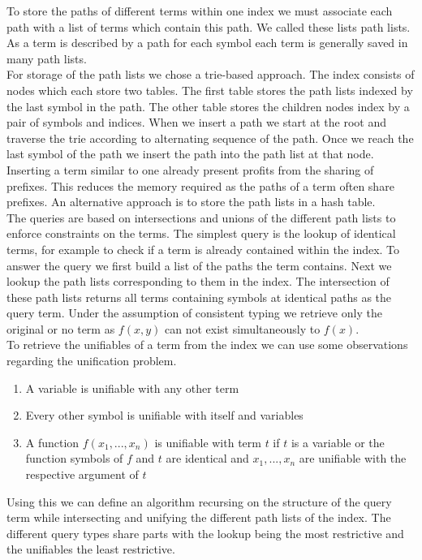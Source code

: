 To store the paths of different terms within one index we must associate each path with a list of terms which contain this path. We called these lists path lists. As a term is described by a path for each symbol each term is generally saved in many path lists.\\
For storage of the path lists we chose a trie-based approach. The index consists of nodes which each store two tables. The first table stores the path lists indexed by the last symbol in the path. The other table stores the children nodes index by a pair of symbols and indices. When we insert a path we start at the root and traverse the trie according to alternating sequence of the path. Once we reach the last symbol of the path we insert the path into the path list at that node. Inserting a term similar to one already present profits from the sharing of prefixes. This reduces the memory required as the paths of a term often share prefixes. An alternative approach is to store the path lists in a hash table.\\
The queries are based on intersections and unions of the different path lists to enforce constraints on the terms. The simplest query is the lookup of identical terms, for example to check if a term is already contained within the index. To answer the query we first build a list of the paths the term contains. Next we lookup the path lists corresponding to them in the index. The intersection of these path lists returns all terms containing symbols at identical paths as the query term. Under the assumption of consistent typing we retrieve only the original or no term as $f(x,y)$ can not exist simultaneously to $f(x)$.\\
To retrieve the unifiables of a term from the index we can use some observations regarding the unification problem.
\begin{enumerate}
  \item A variable is unifiable with any other term
  \item Every other symbol is unifiable with itself and variables
  \item A function $f(x_{1},...,x_{n})$ is unifiable with term $t$ if $t$ is a variable or the function symbols of $f$ and $t$ are identical and $x_{1},...,x_{n}$ are unifiable with the respective argument of $t$
\end{enumerate}
Using this we can define an algorithm recursing on the structure of the query term while intersecting and unifying the different path lists of the index. The different query types share parts with the lookup being the most restrictive and the unifiables the least restrictive.\\

